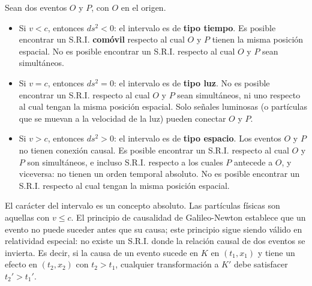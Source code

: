 \begin{definicion}
Sean dos eventos $O$ y $P$, con $O$ en el origen.
\begin{itemize}
\item Si $v<c$, entonces $ds^2<0$: el intervalo es de \textbf{tipo
tiempo}. Es posible encontrar un S.R.I. \textbf{comóvil} respecto al
cual $O$ y $P$ tienen la misma posición espacial. No es posible
encontrar un S.R.I. respecto al cual $O$ y $P$ sean simultáneos.
\item Si $v=c$, entonces $ds^2=0$: el intervalo es de \textbf{tipo luz}.
No es posible encontrar un S.R.I. respecto al cual $O$ y $P$ sean
simultáneos, ni uno respecto al cual tengan la misma posición espacial.
Solo señales luminosas (o partículas que se muevan a la velocidad de la
luz) pueden conectar $O$ y $P$.
\item Si $v>c$, entonces $ds^2>0$: el intervalo es de \textbf{tipo
espacio}. Los eventos $O$ y $P$ no tienen conexión causal. Es posible
encontrar un S.R.I. respecto al cual $O$ y $P$ son simultáneos, e
incluso S.R.I. respecto a los cuales $P$ antecede a $O$, y viceversa: no
tienen un orden temporal absoluto. No es posible encontrar un S.R.I.
respecto al cual tengan la misma posición espacial.
\end{itemize}
\end{definicion}

\begin{observacion}
El carácter del intervalo es un concepto absoluto. Las partículas
físicas son aquellas con $v\le c$. El principio de causalidad de
Galileo-Newton establece que un evento no puede suceder antes que su
causa; este principio sigue siendo válido en relatividad especial: no
existe un S.R.I. donde la relación causal de dos eventos se invierta. Es
decir, si la causa de un evento sucede en $K$ en $(t_1,x_1)$ y tiene un
efecto en $(t_2,x_2)$ con $t_2>t_1$, cualquier transformación a $K'$
debe satisfacer $t_2'>t_1'$.
\end{observacion}

\begin{center}
\end{center}

